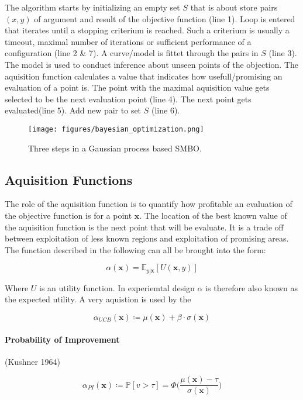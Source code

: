 \documentclass[english]{article}
\newcommand{\x}{\mathbf{x}}
\newcommand{\E}{\mathbb{E}}
\begin{document}
The algorithm starts by initializing an empty set $S$ that is about store pairs $(x,y)$ of argument and result of the objective function (line 1). Loop is entered that iterates until a stopping criterium is reached. Such a criterium is usually a timeout, maximal number of iterations or sufficient performance of a configuration (line 2 \& 7). A curve/model is fittet through the pairs in $S$ (line 3). The model is used to conduct inference about unseen points of the objection. The aquisition function calculates a value that indicates how usefull/promising an evaluation of a point is. The point with the maximal aquisition value gets selected to be the next evaluation point (line 4). The next point gets evaluated(line 5). Add new pair to set $S$ (line 6).

\begin{figure}
  \texttt{[image: figures/bayesian\_optimization.png]}
  \caption{Three steps in a Gaussian process based SMBO.}
  \label{bayesian optimization}
\end{figure}

\subsection{Aquisition Functions}

The role of the aquisition function is to quantify how profitable an evaluation of the objective function is for a point $\x$. The location of the best known value of the aquisition function is the next point that will be evaluate. It is a trade off between exploitation of less known regions and exploitation of promising areas. The function described in the following can all be brought into the form:

$$\alpha(\x) = \E_{y|\x}[U(\x,y)]$$

Where $U$ is an utility function. In experiemtal design $\alpha$ is therefore also known as the expected utility.
A very aquistion is used by the

$$\alpha_{UCB}(\x) \coloneqq \mu(\x) + \beta \cdot \sigma(\x) $$

\paragraph{Probability of Improvement}

(Kushner 1964)

$$
\alpha_{PI}(\x) \coloneqq \mathbb{P}[v>\tau] = \Phi\bigg(\frac{\mu(\x)-\tau}{\sigma(\x)}\bigg)
$$
\end{document}
